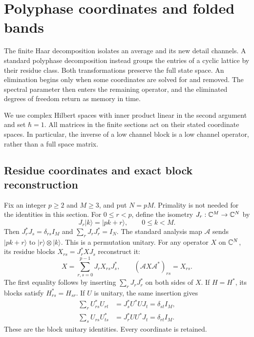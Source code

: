 \section{Polyphase coordinates and folded bands}
\label{a-spectral-polyphase}

The finite Haar decomposition isolates an average and its new detail
channels. A standard polyphase decomposition instead groups the entries
of a cyclic lattice by their residue class. Both transformations preserve
the full state space. An elimination begins only when some coordinates
are solved for and removed. The spectral parameter then enters the
remaining operator, and the eliminated degrees of freedom return as
memory in time.

We use complex Hilbert spaces with inner product linear in the second
argument and set $\hbar=1$. All matrices in the finite sections act on
their stated coordinate spaces. In particular, the inverse of a low
channel block is a low channel operator, rather than a full space matrix.

\subsection{Residue coordinates and exact block reconstruction}

Fix an integer $p\geq2$ and $M\geq3$, and put $N=pM$. Primality is not
needed for the identities in this section. For $0\leq r<p$, define the
isometry $J_r:\mathbb C^M\to\mathbb C^N$ by
\[
 J_r|k\rangle=|pk+r\rangle,\qquad 0\leq k<M.
\]
Then $J_r^*J_s=\delta_{rs}I_M$ and $\sum_rJ_rJ_r^*=I_N$. The standard
analysis map $\mathcal A$ sends $|pk+r\rangle$ to
$|r\rangle\otimes|k\rangle$. This is a permutation unitary. For any
operator $X$ on $\mathbb C^N$, its residue blocks $X_{rs}=J_r^*XJ_s$ reconstruct it:
\begin{equation}
 X=\sum_{r,s=0}^{p-1}J_rX_{rs}J_s^*,\qquad
 (\mathcal A X\mathcal A^*)_{rs}=X_{rs}.
 \label{a-spectral-block-reconstruction}
\end{equation}
The first equality follows by inserting $\sum_rJ_rJ_r^*$ on both sides
of $X$. If $H=H^*$, its blocks satisfy $H_{rs}^*=H_{sr}$. If $U$ is
unitary, the same insertion gives
\begin{align}
 \sum_rU_{rs}^*U_{rt}&=J_s^*U^*UJ_t=\delta_{st}I_M,\nonumber\\
 \sum_sU_{rs}U_{ts}^*&=J_r^*UU^*J_t=\delta_{rt}I_M.
 \label{a-spectral-paraunitarity}
\end{align}
These are the block unitary identities. Every coordinate is retained.

